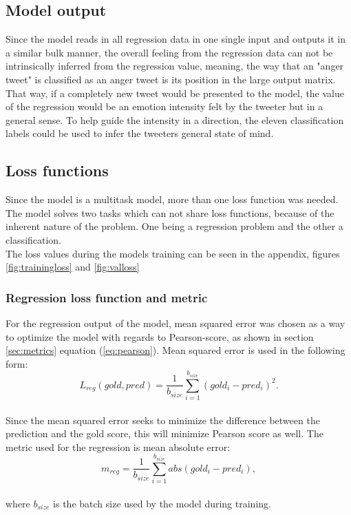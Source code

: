 \subsection{Model output}
Since the model reads in all regression data in one single input and outputs it in a similar bulk manner, the overall feeling from the regression data can not be intrinsically inferred from the regression value, meaning, the way that an "anger tweet" is classified as an anger tweet is its position in the large output matrix. That way, if a completely new tweet would be presented to the model, the value of the regression would be an emotion intensity felt by the tweeter but in a general sense. To help guide the intensity in a direction, the eleven classification labels could be used to infer the tweeters general state of mind. 

\subsection{Loss functions}
Since the model is a multitask model, more than one loss function was needed. The model solves two tasks which can not share loss functions, because of the inherent nature of the problem. One being a regression problem and the other a classification. \\
The loss values during the models training can be seen in the appendix, figures \ref{fig:trainingloss} and \ref{fig:valloss}

\subsubsection{Regression loss function and metric}
For the regression output of the model, mean squared error was chosen as a way to optimize the model with regards to Pearson-score, as shown in section \ref{sec:metrics} equation (\ref{eq:pearson}). Mean squared error is used in the following form:\\
\begin{equation} \label{eq:lreg}
L_{reg}(gold, pred)=\dfrac{1}{b_{size}}\sum^{b_{size}}_{i=1}\left(gold_{i}-pred_{i}\right)^{2}.
\end{equation}\\
Since the mean squared error seeks to minimize the difference between the prediction and the gold score, this will minimize Pearson score as well. 
The metric used for the regression is mean absolute error:\\
\begin{equation} \label{eq:meanabs}
m_{reg}=\dfrac{1}{b_{size}}\sum^{b_{size}}_{i=1}abs\left(gold_{i}-pred_{i}\right),
\end{equation}\\
where $b_{size}$ is the batch size used by the model during training. 

